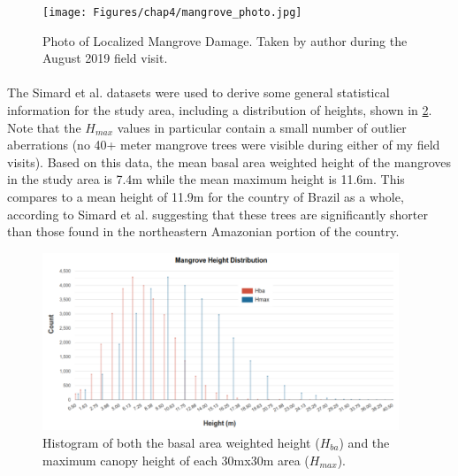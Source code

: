 \begin{figure}[!htb] 
\centering
\texttt{[image: Figures/chap4/mangrove\_photo.jpg]}
\caption[Photo of Localized Mangrove Damage]{Photo of Localized Mangrove Damage. Taken by author during the August 2019 field visit.}
\label{fig:mangrove_photo}
\end{figure}


\paragraph{} \leavevmode\newline

The Simard et al. datasets were used to derive some general statistical information for the study area, including a distribution of heights, shown in \ref{fig:height_histogram}. Note that the $H_{max}$ values in particular contain a small number of outlier aberrations (no 40+ meter mangrove trees were visible during either of my field visits). Based on this data, the mean basal area weighted height of the mangroves in the study area is 7.4m while the mean maximum height is 11.6m. This compares to a mean height of 11.9m for the country of Brazil as a whole, according to Simard et al. \cite{simardMangroveCanopyHeight2019} suggesting that these trees are significantly shorter than those found in the northeastern Amazonian portion of the country.

\begin{figure}[!htb] 
\centering
\includegraphics[width=0.95\textwidth]{Figures/chap4/height_histogram.png}
\caption[Histogram of Mangrove Height in Region]{Histogram of both the basal area weighted height ($H_{ba}$) and the maximum canopy height of each 30mx30m area ($H_{max}$).}
\label{fig:height_histogram}
\end{figure}

\paragraph{} \leavevmode\newline

